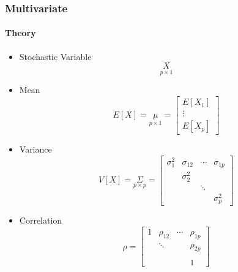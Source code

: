 \documentclass[aspectratio=169,10pt,t]{beamer}
\begin{document}
\begin{frame}[t]
    \frametitle{Multivariate}
    \framesubtitle{Theory}
    \begin{itemize}
        \item<only@1> Stochastic Variable
            \[
                \underset{p\times 1}{X}
            \] 
        \item Mean
            \[
                E \left[ X \right] =
                \underset{p\times 1}{\mu} =
                \begin{bmatrix}
                    E \left[ X_1  \right] \\
                    \vdots\\
                    E \left[ X_p  \right] 
                \end{bmatrix}
            \] 
        \item Variance
            \[
                V \left[ X  \right]  =
                \underset{p\times p}{\Sigma}
                =
                \begin{bmatrix}
                    \sigma_1^{2} & \sigma_{12} & \cdots & \sigma_{1p}\\
                                 & \sigma_2^{2} & &\\
                                 & & \ddots &\\
                                 &&& \sigma_{p}^{2}
                \end{bmatrix}
            \] 
					\item<2> Correlation
						\[
						\rho = \begin{bmatrix}
							1 & \rho_{12} & \cdots & \rho_{1p}\\
								& \ddots& & \rho_{2p}\\
								&&&\\
								& & &1
						\end{bmatrix}
						\] 
    \end{itemize}
\end{frame}
\end{document}
